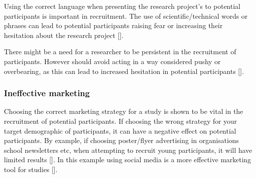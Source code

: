 Using the correct language when presenting the research project's to potential participants is important in recruitment. The use of scientific/technical words or phrases can lead to potential participants raising fear or increasing their hesitation about the research project [\cite{pkf_2018}]. 

There might be a need for a researcher to be persistent in the recruitment of participants. However should avoid acting in a way considered pushy or overbearing, as this can lead to increased hesitation in potential participants [\cite{pkf_2018}].

\subsubsection{Ineffective marketing}
Choosing the correct marketing strategy for a study is shown to be vital in the recruitment of potential participants. If choosing the wrong strategy for your target demographic of participants, it can have a negative effect on potential participants. By example, if choosing poster/flyer advertising in organisations school newsletters etc, when attempting to recruit young participants, it will have limited results [\cite{aj_2015}]. In this example using social media is a more effective marketing tool for studies [\cite{aj_2015}].